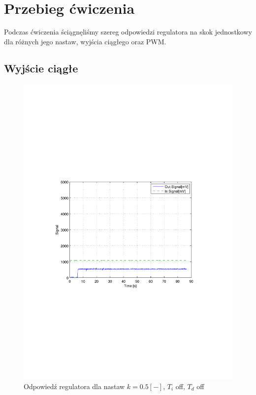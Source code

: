 \documentclass[12pt]{article}
\begin{document}
\section{Przebieg ćwiczenia}

Podczas ćwiczenia ściągnęliśmy szereg odpowiedzi regulatora na skok jednostkowy
dla różnych jego nastaw, wyjścia ciągłego oraz PWM.

\subsection{Wyjście ciągłe}

\begin{figure}[!htb]
	\begin{center}
		\includegraphics[width=15cm,trim=3cm 9cm 3cm 9cm,clip]
		{../res/img/cont_0,5_0_0.pdf}
	\end{center}
	\caption{Odpowiedź regulatora dla nastaw $k=0.5[-]$, $T_i$ off, $T_d$ off}
\end{figure}
\end{document}
